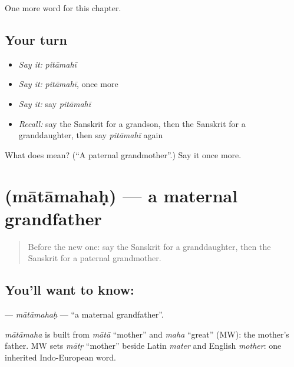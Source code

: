 \begin{grammarlens}[title={What you've built}]
One more word for this chapter.
\end{grammarlens}

\subsection*{Your turn}
\begin{itemize}
\raggedright
  \item \emph{Say it:} \emph{pitāmahī}
  \item \emph{Say it:} \emph{pitāmahī}, once more
  \item \emph{Say it:} say \emph{pitāmahī}
  \item \emph{Recall:} say the Sanskrit for a grandson, then the Sanskrit for a granddaughter, then say \emph{pitāmahī} again
\end{itemize}

\begin{tcolorbox}[breakable,colback=teal!4,colframe=teal!35!black,title={Before you move on}]
What does  mean? (\textquotedblleft{}A paternal grandmother\textquotedblright{}.) Say it once more.
\end{tcolorbox}
\section[\texorpdfstring{\sk{मातामहः} (mātāmahaḥ)}{मातामहः (mātāmahaḥ)}]{ (mātāmahaḥ) — a maternal grandfather}

\label{lesson:SA-C146-matamahah}



\begin{quote}
Before the new one: say the Sanskrit for a granddaughter, then the Sanskrit for a paternal grandmother.
\end{quote}

\subsection*{You'll want to know: }
\textbf{} — \emph{mātāmahaḥ} — \textquotedblleft{}a maternal grandfather\textquotedblright{}.

\begin{cousinweb}
\emph{mātāmaha} is built from \emph{mātā} \textquotedblleft{}mother\textquotedblright{} and \emph{maha} \textquotedblleft{}great\textquotedblright{} (MW): the mother's father. MW sets \emph{mātṛ} \textquotedblleft{}mother\textquotedblright{} beside Latin \emph{mater} and English \emph{mother}: one inherited Indo-European word.
\end{cousinweb}

